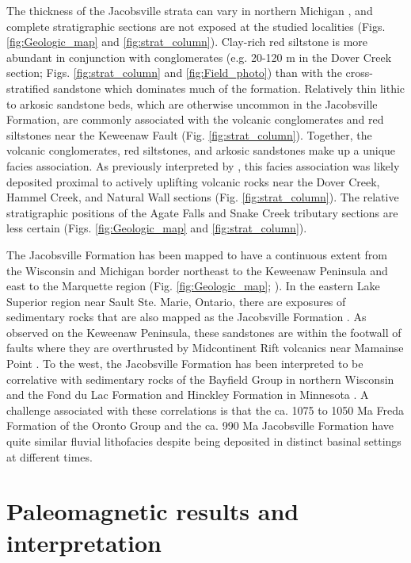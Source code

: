 The thickness of the Jacobsville strata can vary in northern Michigan \cite{Hamblin1958a, Kalliokoski1982a}, and complete stratigraphic sections are not exposed at the studied localities (Figs. \ref{fig:Geologic_map} and \ref{fig:strat_column}). Clay-rich red siltstone is more abundant in conjunction with conglomerates (e.g. 20-120 m in the Dover Creek section; Figs. \ref{fig:strat_column} and \ref{fig:Field_photo}) than with the cross-stratified sandstone which dominates much of the formation. Relatively thin lithic to arkosic sandstone beds, which are otherwise uncommon in the Jacobsville Formation, are commonly associated with the volcanic conglomerates and red siltstones near the Keweenaw Fault (Fig. \ref{fig:strat_column}). Together, the volcanic conglomerates, red siltstones, and arkosic sandstones make up a unique facies association. As previously interpreted by , this facies association was likely deposited proximal to actively uplifting volcanic rocks near the Dover Creek, Hammel Creek, and Natural Wall sections (Fig. \ref{fig:strat_column}). The relative stratigraphic positions of the Agate Falls and Snake Creek tributary sections are less certain (Figs. \ref{fig:Geologic_map} and \ref{fig:strat_column}).

The Jacobsville Formation has been mapped to have a continuous extent from the Wisconsin and Michigan border northeast to the Keweenaw Peninsula and east to the Marquette region (Fig. \ref{fig:Geologic_map}; ). In the eastern Lake Superior region near Sault Ste. Marie, Ontario, there are exposures of sedimentary rocks that are also mapped as the Jacobsville Formation \cite{Hamblin1958a}. As observed on the Keweenaw Peninsula, these sandstones are within the footwall of faults where they are overthrusted by Midcontinent Rift volcanics near Mamainse Point \cite{Manson1994a}. To the west, the Jacobsville Formation has been interpreted to be correlative with sedimentary rocks of the Bayfield Group in northern Wisconsin and the Fond du Lac Formation and Hinckley Formation in Minnesota \cite{Thwaites1912a, Hamblin1958a, Wallace1971a, Kalliokoski1982a, Ojakangas2001b}. A challenge associated with these correlations is that the ca. 1075 to 1050 Ma Freda Formation of the Oronto Group and the ca. 990 Ma Jacobsville Formation have quite similar fluvial lithofacies despite being deposited in distinct basinal settings at different times.

\section*{Paleomagnetic results and interpretation}

